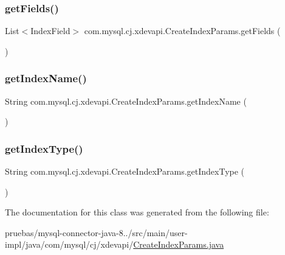 \subsubsection{\texorpdfstring{get\+Fields()}{getFields()}}
{\footnotesize\ttfamily List$<$Index\+Field$>$ com.\+mysql.\+cj.\+xdevapi.\+Create\+Index\+Params.\+get\+Fields (\begin{DoxyParamCaption}{ }\end{DoxyParamCaption})}

\mbox{\label{classcom_1_1mysql_1_1cj_1_1xdevapi_1_1_create_index_params_a4f866cc4a1ca10a230ea290e065122f3}} 
\subsubsection{\texorpdfstring{get\+Index\+Name()}{getIndexName()}}
{\footnotesize\ttfamily String com.\+mysql.\+cj.\+xdevapi.\+Create\+Index\+Params.\+get\+Index\+Name (\begin{DoxyParamCaption}{ }\end{DoxyParamCaption})}

\mbox{\label{classcom_1_1mysql_1_1cj_1_1xdevapi_1_1_create_index_params_a75dc333dcf689c02cdeb2255decde50e}} 
\subsubsection{\texorpdfstring{get\+Index\+Type()}{getIndexType()}}
{\footnotesize\ttfamily String com.\+mysql.\+cj.\+xdevapi.\+Create\+Index\+Params.\+get\+Index\+Type (\begin{DoxyParamCaption}{ }\end{DoxyParamCaption})}



The documentation for this class was generated from the following file\+:\begin{DoxyCompactItemize}
\item 
pruebas/mysql-\/connector-\/java-\/8../src/main/user-\/impl/java/com/mysql/cj/xdevapi/\mbox{\hyperlink{_create_index_params_8java}{Create\+Index\+Params.\+java}}\end{DoxyCompactItemize}
